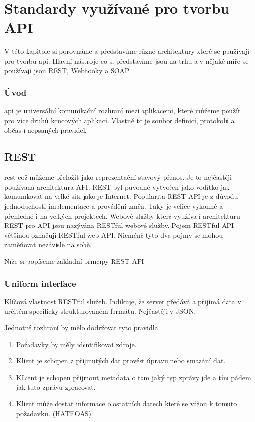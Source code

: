\chapter{Standardy využívané pro tvorbu API}
V této kapitole si porovnáme a představíme různé architektury které se používají pro tvorbu \gls{api}.
Hlavní nástroje co si představíme jsou na trhu a v nějaké míře se používají jsou REST, Webhooky a SOAP

\subsection*{Úvod}
\gls{api} je universální komunikační rozhraní mezi aplikacemi, které můžeme použít pro více druhů koncových aplikací. Vlastně to je soubor definicí, protokolů a občas i nepsaných pravidel.

\section{REST}
\gls{rest} což můžeme přeložit jako reprezentační stavový přenos. Je to nejčastěji používaná architektura API. REST byl původně vytvořen jako vodítko jak komunikovat na velké síti jako je Internet. Popularita REST API je z důvodu jednoduchosti implementace a provádění změn. Taky je velice výkonné a přehledné i na velkých projektech.
Webové služby které využívají architekturu REST pro API jsou nazývána RESTful webové služby. Pojem RESTful API většinou označují RESTful web API. Nicméně tyto dva pojmy se mohou zaměňovat nezávisle na sobě.

Níže si popíšeme základní principy REST API

\subsection{Uniform interface}
Klíčová vlastnost RESTful služeb. Indikuje, že server předává a přijímá data v určitém specificky strukturovaném formátu. Nejčastěji v JSON.

Jednotné rozhraní by mělo dodržovat tyto pravidla\
\begin{enumerate}
    \item Požadavky by měly identifikovat zdroje.
    \item Klient je schopen z přijmutých dat provést úpravu nebo smazání dat.
    \item KLient je schopen přijmout metadata o tom jaký typ zprávy jde a tím pádem jak tuto zprávu zpracovat.
    \item Klient může dostat informace o ostatních datech které se vážou k tomuto požadavku. (HATEOAS)
\end{enumerate}

